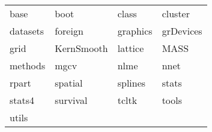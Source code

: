 \begin{tabular}{llll} 
base & boot & class & cluster\\ 
datasets & foreign & graphics & grDevices\\ 
grid & KernSmooth & lattice & MASS\\ 
methods & mgcv & nlme & nnet\\ 
rpart & spatial & splines & stats\\ 
stats4 & survival & tcltk & tools\\ 
utils  &   &   &   \\ 
\end{tabular}
